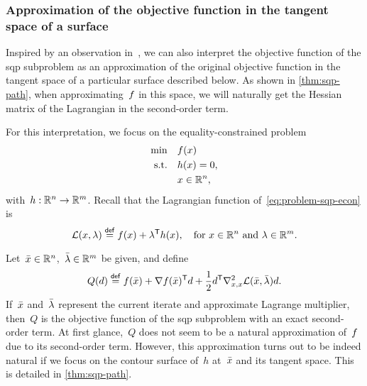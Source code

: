 \subsubsection{Approximation of the objective function in the tangent space of a surface}

Inspired by an observation in~\cite[\S~2]{Gill_Wong_2011}, we can also interpret the objective function of the \gls{sqp} subproblem as an approximation of the original objective function in the tangent space of a particular surface described below.
As shown in \cref{thm:sqp-path}, when approximating~$f$ in this space, we will naturally get the Hessian matrix of the Lagrangian in the second-order term.

For this interpretation, we focus on the equality-constrained problem
\begin{subequations}
    \label{eq:problem-sqp-econ}
    \begin{align}
        \min        & \quad \obj(\iter)\\
        \text{s.t.} & \quad h(\iter) = 0,\\
                    & \quad \iter \in \R^n, \nonumber
    \end{align}
\end{subequations}
with~$h : \mathbb{R}^n \to \mathbb{R}^m$.
Recall that the Lagrangian function of~\cref{eq:problem-sqp-econ} is
\begin{equation*}
    \lag(\iter, \lm) \eqdef \obj(\iter) + \lm^{\T} h(\iter), \quad \text{for~$\iter \in \R^n$ and~$\lm \in \R^m$.}
\end{equation*}

Let~$\bar{\iter} \in \R^n$,~$\bar{\lm} \in \R^m$ be given, and define
\begin{equation*}
    Q(\step) \eqdef \obj(\bar{\iter}) + \nabla \obj(\bar{\iter})^{\T} \step + \frac{1}{2} \step^{\T} \nabla_{x, x}^2 \lag(\bar{\iter}, \bar{\lm}) \step.
\end{equation*}
If~$\bar{\iter}$ and~$\bar{\lm}$ represent the current iterate and approximate Lagrange multiplier, then~$Q$ is the objective function of the \gls{sqp} subproblem with an exact second-order term.
At first glance,~$Q$ does not seem to be a natural approximation of~$f$ due to its second-order term.
However, this approximation turns out to be indeed natural if we focus on the contour surface of~$h$ at~$\bar{\iter}$ and its tangent space.
This is detailed in \cref{thm:sqp-path}.


